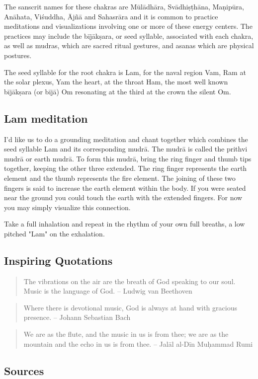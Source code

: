 \documentclass[12pt]{article}
\begin{document}
The sanscrit names for these chakras are Mūlādhāra, Svādhiṣṭhāna, Maṇipūra, Anāhata, Viśuddha, Ājñā and Sahasrāra and it is common to practice meditations and visualizations involving one or more of these energy centers. The practices may include the bījākṣara, or seed syllable, associated with each chakra, as well as mudras, which are sacred ritual gestures, and asanas which are physical postures.

The seed syllable for the root chakra is Lam, for the naval region Vam, Ram at the solar plexus, Yam the heart, at the throat Ham, the most well known bījākṣara (or bījā) Om resonating at the third at the crown the silent Om.

\subsection*{Lam meditation}

I'd like us to do a grounding meditation and chant together which combines the seed syllable Lam and its corresponding mudrā. The mudrā is called the prithvi mudrā or earth mudrā. To form this mudrā, bring the ring finger and thumb tips together, keeping the other three extended. The ring finger represents the earth element and the thumb represents the fire element. The joining of these two fingers is said to increase the earth element within the body. If you were seated near the ground you could touch the earth with the extended fingers. For now you may simply visualize this connection.

Take a full inhalation and repeat in the rhythm of your own full breaths, a low pitched "Lam" on the exhalation.

\subsection*{Inspiring Quotations}

\begin{quote}
  The vibrations on the air are the breath of God speaking to our soul. Music is the language of God. – Ludwig van Beethoven
\end{quote}

\begin{quote}
  Where there is devotional music, God is always at hand with gracious presence. – Johann Sebastian Bach
\end{quote}

\begin{quote}
  We are as the flute, and the music in us is from thee; we are as the mountain and the echo in us is from thee. – Jalāl al-Dīn Muḥammad Rumi
\end{quote}




\subsection*{Sources}

\end{document}
